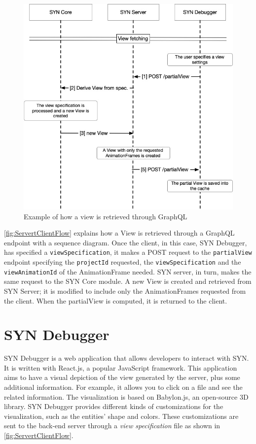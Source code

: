 \begin{figure}
    \center
    \includegraphics[width=\textwidth]{ServertClientFlow.jpg}
    \caption{Example of how a view is retrieved through GraphQL}
    \label{fig:ServertClientFlow}
\end{figure}

\bigbreak
\autoref{fig:ServertClientFlow} explains how a View is retrieved through a GraphQL endpoint with a sequence diagram. Once the client, in this case, SYN Debugger, has specified a \texttt{viewSpecification}, it makes a POST request to the 
\texttt{partialView} endpoint specifying the \texttt{projectId} requested, the \texttt{viewSpecification} and the \texttt{viewAnimationId} of the AnimationFrame needed. SYN server, in turn, makes the same request to the SYN Core module. A new View is created and retrieved from SYN Server; it is modified to include only the AnimationFrames requested from the client. When the partialView is computed, it is returned to the client. 


\section{SYN Debugger}

SYN Debugger is a web application that allows developers to interact with SYN. It is written with React.js, a popular JavaScript framework. 
This application aims to have a visual depiction of the view generated by the server, plus some additional information. 
For example, it allows you to click on a file and see the related information. 
The visualization is based on Babylon.js, an open-source 3D library. 
SYN Debugger provides different kinds of customizations for the visualization, such as the entities' shape and colors. 
These customizations are sent to the back-end server through a {\em view specification} file as shown in \autoref{fig:ServertClientFlow}. 

